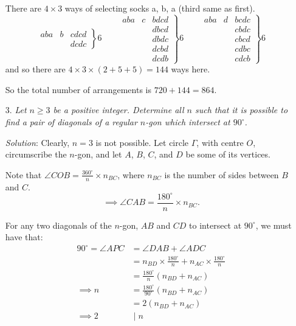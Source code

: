 \documentclass{article}
\begin{document}
\begin{enumerate}[1.]
There are $4 \times 3$ ways of selecting socks a, b, a (third same as first).
$$
\left. \begin{matrix}
  aba & b & cdcd \\
  & & dcdc
\end{matrix} \right\} 6
\qquad
\left. \begin{matrix}
  aba & c & bdcd \\
  & & dbcd \\
  & & dbdc \\
  & & dcbd \\
  & & dcdb
\end{matrix} \right\} 6
\qquad
\left. \begin{matrix}
  aba & d & bcdc \\
  & & cbdc \\
  & & cbcd \\
  & & cdbc \\
  & & cdcb
\end{matrix} \right\} 6
$$
and so there are $4 \times 3 \times (2 + 5 + 5) = 144$ ways here.

So the total number of arrangements is $720 + 144 = 864$.


\item[3.] %
\textit{Let $n\geq3$ be a positive integer.
Determine all $n$ such that it is possible to find a pair of diagonals of a regular $n$-gon which intersect at $90^\circ$.}

\textit{Solution}:
Clearly, $n = 3$ is not possible. Let circle $\Gamma$, with centre $O$, circumscribe the $n$-gon, and let $A$, $B$, $C$, and $D$ be some of its vertices.

Note that $\angle COB = \frac{360^\circ}{n} \times n_{BC}$, where $n_{BC}$ is the number of sides between $B$ and $C$.
$$ \implies \angle CAB = \frac{180^\circ}{n} \times n_{BC}. $$

For any two diagonals of the $n$-gon, $AB$ and $CD$ to intersect at $90^\circ$, we must have that:
\begin{align*}
  90^\circ = \angle APC & = \angle DAB + \angle ADC \\
  & = n_{BD} \times \frac{180^\circ}{n} + n_{AC} \times \frac{180^\circ}{n} \\
  & = \frac{180^\circ}{n} (n_{BD} + n_{AC}) \\
  \implies n & = \frac{180^\circ}{90^\circ} (n_{BD} + n_{AC}) \\
  & = 2 (n_{BD} + n_{AC}) \\
  \implies 2 & \; |\; n
\end{align*}


\end{enumerate}
\end{document}
